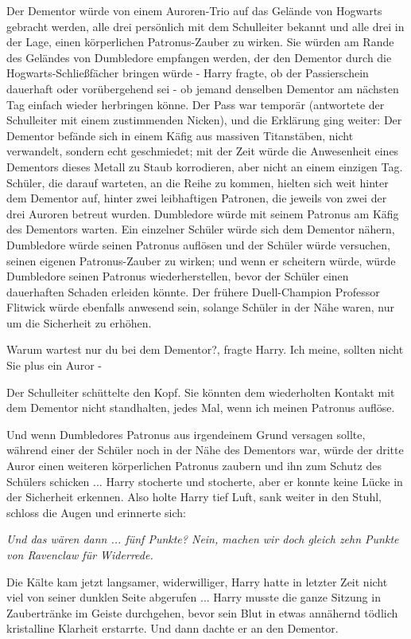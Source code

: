 Der Dementor würde von einem Auroren-Trio auf das Gelände von Hogwarts gebracht
werden, alle drei persönlich mit dem Schulleiter bekannt und alle drei in der
Lage, einen körperlichen Patronus-Zauber zu wirken. Sie würden am Rande des
Geländes von Dumbledore empfangen werden, der den Dementor durch die
Hogwarts-Schließfächer bringen würde - Harry fragte, ob der Passierschein
dauerhaft oder vorübergehend sei - ob jemand denselben Dementor am nächsten Tag
einfach wieder herbringen könne. Der Pass war temporär (antwortete der
Schulleiter mit einem zustimmenden Nicken), und die Erklärung ging weiter: Der
Dementor befände sich in einem Käfig aus massiven Titanstäben, nicht verwandelt,
sondern echt geschmiedet; mit der Zeit würde die Anwesenheit eines Dementors
dieses Metall zu Staub korrodieren, aber nicht an einem einzigen Tag. Schüler,
die darauf warteten, an die Reihe zu kommen, hielten sich weit hinter dem
Dementor auf, hinter zwei leibhaftigen Patronen, die jeweils von zwei der drei
Auroren betreut wurden. Dumbledore würde mit seinem Patronus am Käfig des
Dementors warten. Ein einzelner Schüler würde sich dem Dementor nähern,
Dumbledore würde seinen Patronus auflösen und der Schüler würde versuchen,
seinen eigenen Patronus-Zauber zu wirken; und wenn er scheitern würde, würde
Dumbledore seinen Patronus wiederherstellen, bevor der Schüler einen dauerhaften
Schaden erleiden könnte. Der frühere Duell-Champion Professor Flitwick würde
ebenfalls anwesend sein, solange Schüler in der Nähe waren, nur um die
Sicherheit zu erhöhen.

\glqq{}Warum wartest nur du bei dem Dementor?\grqq{}, fragte Harry. \glqq{}Ich
meine, sollten nicht Sie plus ein Auror -\grqq{}

Der Schulleiter schüttelte den Kopf. \glqq{}Sie könnten dem wiederholten Kontakt
mit dem Dementor nicht standhalten, jedes Mal, wenn ich meinen Patronus
auflöse.\grqq{}

Und wenn Dumbledores Patronus aus irgendeinem Grund versagen sollte, während
einer der Schüler noch in der Nähe des Dementors war, würde der dritte Auror
einen weiteren körperlichen Patronus zaubern und ihn zum Schutz des Schülers
schicken ... Harry stocherte und stocherte, aber er konnte keine Lücke in der
Sicherheit erkennen. Also holte Harry tief Luft, sank weiter in den Stuhl,
schloss die Augen und erinnerte sich:

\emph{\glqq{}Und das wären dann ... fünf Punkte? Nein, machen wir doch gleich
zehn Punkte von Ravenclaw für Widerrede.}\grqq{}

Die Kälte kam jetzt langsamer, widerwilliger, Harry hatte in letzter Zeit nicht
viel von seiner dunklen Seite abgerufen ... Harry musste die ganze Sitzung in
Zaubertränke im Geiste durchgehen, bevor sein Blut in etwas annähernd tödlich
kristalline Klarheit erstarrte. Und dann dachte er an den Dementor.

